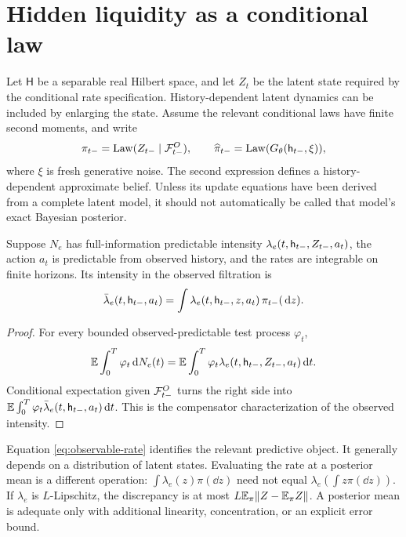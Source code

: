 \section{Hidden liquidity as a conditional law}\label{sec:filter}
Let $\mathsf H$ be a separable real Hilbert space, and let $Z_t$ be the latent state required by the conditional rate specification. History-dependent latent dynamics can be included by enlarging the state. Assume the relevant conditional laws have finite second moments, and write
\begin{equation}
 \pi_{t-}=\operatorname{Law}(Z_{t-}\mid\mathcal F^O_{t-}),\qquad
 \widehat\pi_{t-}=\operatorname{Law}(G_\theta(\mathsf h_{t-},\xi)),
\end{equation}
where $\xi$ is fresh generative noise. The second expression defines a history-dependent approximate belief. Unless its update equations have been derived from a complete latent model, it should not automatically be called that model's exact Bayesian posterior.

\begin{proposition}\label{prop:filter-rate}
Suppose $N_e$ has full-information predictable intensity
$\lambda_e(t,\mathsf h_{t-},Z_{t-},a_t)$, the action $a_t$ is predictable from observed history, and the rates are integrable on finite horizons. Its intensity in the observed filtration is
\begin{equation}\label{eq:observable-rate}
 \bar\lambda_e(t,\mathsf h_{t-},a_t)
 =\int \lambda_e(t,\mathsf h_{t-},z,a_t)\,\pi_{t-}(\,\mathrm d z).
\end{equation}
\end{proposition}
\begin{proof}
For every bounded observed-predictable test process $\varphi_t$,
\[
 \mathbb E\int_0^T\varphi_t\,\mathrm d N_e(t)
 =\mathbb E\int_0^T\varphi_t\lambda_e(t,\mathsf h_{t-},Z_{t-},a_t)\,\mathrm d t.
\]
Conditional expectation given $\mathcal F^O_{t-}$ turns the right side into
$\mathbb E\int_0^T\varphi_t\bar\lambda_e(t,\mathsf h_{t-},a_t)\,\mathrm d t$.
This is the compensator characterization of the observed intensity.
\end{proof}

Equation \eqref{eq:observable-rate} identifies the relevant predictive object. It generally depends on a distribution of latent states. Evaluating the rate at a posterior mean is a different operation:
$\int\lambda_e(z)\pi(\dd z)$ need not equal $\lambda_e(\int z\pi(\dd z))$.
If $\lambda_e$ is $L$-Lipschitz, the discrepancy is at most
$L\mathbb E_\pi\|Z-\mathbb E_\pi Z\|$. A posterior mean is adequate only with additional linearity, concentration, or an explicit error bound.

